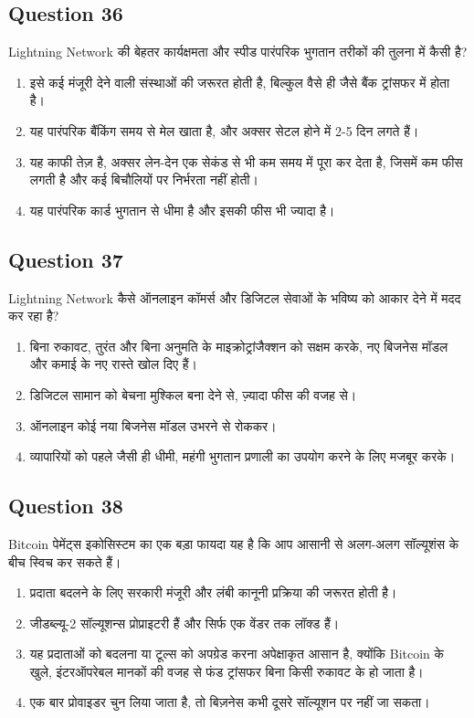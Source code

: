 \documentclass[12pt,a4paper]{article}
\begin{document}
\bigskip


\subsection*{Question 36}
Lightning Network की बेहतर कार्यक्षमता और स्पीड पारंपरिक भुगतान तरीकों की तुलना में कैसी है?

\begin{enumerate}[label=\Alph*., leftmargin=*]
\item इसे कई मंजूरी देने वाली संस्थाओं की जरूरत होती है, बिल्कुल वैसे ही जैसे बैंक ट्रांसफर में होता है।
\item यह पारंपरिक बैंकिंग समय से मेल खाता है, और अक्सर सेटल होने में 2-5 दिन लगते हैं।
\item यह काफी तेज़ है, अक्सर लेन-देन एक सेकंड से भी कम समय में पूरा कर देता है, जिसमें कम फीस लगती है और कई बिचौलियों पर निर्भरता नहीं होती।
\item यह पारंपरिक कार्ड भुगतान से धीमा है और इसकी फीस भी ज्यादा है।
\end{enumerate}

\bigskip


\subsection*{Question 37}
Lightning Network कैसे ऑनलाइन कॉमर्स और डिजिटल सेवाओं के भविष्य को आकार देने में मदद कर रहा है?

\begin{enumerate}[label=\Alph*., leftmargin=*]
\item बिना रुकावट, तुरंत और बिना अनुमति के माइक्रोट्रांजैक्शन को सक्षम करके, नए बिजनेस मॉडल और कमाई के नए रास्ते खोल दिए हैं।
\item डिजिटल सामान को बेचना मुश्किल बना देने से, ज़्यादा फीस की वजह से।
\item ऑनलाइन कोई नया बिजनेस मॉडल उभरने से रोककर।
\item व्यापारियों को पहले जैसी ही धीमी, महंगी भुगतान प्रणाली का उपयोग करने के लिए मजबूर करके।
\end{enumerate}

\bigskip


\subsection*{Question 38}
Bitcoin पेमेंट्स इकोसिस्टम का एक बड़ा फायदा यह है कि आप आसानी से अलग-अलग सॉल्यूशंस के बीच स्विच कर सकते हैं।

\begin{enumerate}[label=\Alph*., leftmargin=*]
\item प्रदाता बदलने के लिए सरकारी मंजूरी और लंबी कानूनी प्रक्रिया की जरूरत होती है।
\item जीडब्ल्यू-2 सॉल्यूशन्स प्रोप्राइटरी हैं और सिर्फ एक वेंडर तक लॉक्ड हैं।
\item यह प्रदाताओं को बदलना या टूल्स को अपग्रेड करना अपेक्षाकृत आसान है, क्योंकि Bitcoin के खुले, इंटरऑपरेबल मानकों की वजह से फंड ट्रांसफर बिना किसी रुकावट के हो जाता है।
\item एक बार प्रोवाइडर चुन लिया जाता है, तो बिज़नेस कभी दूसरे सॉल्यूशन पर नहीं जा सकता।
\end{enumerate}
\end{document}
